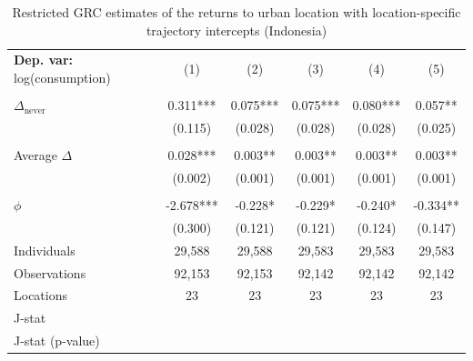 \begin{table}[htbp] \centering \begin{threeparttable}
 \caption{Restricted GRC estimates of the returns to urban location with location-specific trajectory intercepts (Indonesia)} 
 \label{tab:verdier_robust_onestep_IDN_consumption_urban_unb} 
\begin{tabular}{l ccccc} \toprule  \textbf{Dep. var:}  log(consumption) 
                    &\multicolumn{1}{c}{(1)}   &\multicolumn{1}{c}{(2)}   &\multicolumn{1}{c}{(3)}   &\multicolumn{1}{c}{(4)}   &\multicolumn{1}{c}{(5)}   \\
                    &               &               &               &               &               \\
\addlinespace
$\Delta_{\text{never}}$&       0.311***&       0.075***&       0.075***&       0.080***&       0.057** \\
                    &     (0.115)   &     (0.028)   &     (0.028)   &     (0.028)   &     (0.025)   \\
                    &               &               &               &               &               \\
\addlinespace
Average $\Delta$    &       0.028***&       0.003** &       0.003** &       0.003** &       0.003** \\
                    &     (0.002)   &     (0.001)   &     (0.001)   &     (0.001)   &     (0.001)   \\
                    &               &               &               &               &               \\
\addlinespace
$\phi$              &      -2.678***&      -0.228*  &      -0.229*  &      -0.240*  &      -0.334** \\
                    &     (0.300)   &     (0.121)   &     (0.121)   &     (0.124)   &     (0.147)   \\
\addlinespace
Individuals         &      29,588   &      29,588   &      29,583   &      29,583   &      29,583   \\
Observations        &      92,153   &      92,153   &      92,142   &      92,142   &      92,142   \\
Locations           &          23   &          23   &          23   &          23   &          23   \\
J-stat              &               &               &               &               &               \\
J-stat (p-value)    &               &               &               &               &               \\

\end{tabular}
\end{threeparttable}
\end{table}

